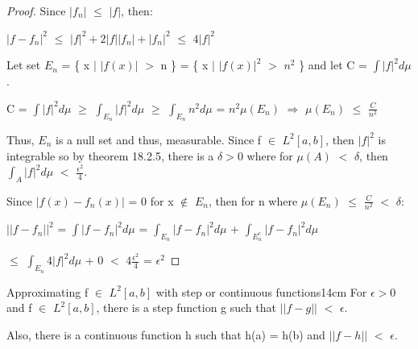     \begin{proof}
        Since $|f_n|$ $\leq$ $|f|$, then:

        \hspace{0.5cm}
        $|f - f_n|^2$
        $\leq$ $|f|^2 + 2|f||f_n| + |f_n|^2$
        $\leq$ $4|f|^2$

        Let set $E_n$ = \{ x $|$ $|f(x)|$ $>$ n \}
        = \{ x $|$ $|f(x)|^2$ $>$ $n^2$ \} and let C = $\int |f|^2 d\mu$.

        \hspace{0.5cm}
        C = $\int |f|^2 d\mu$
        $\geq$ $\int_{E_n} |f|^2 d\mu$
        $\geq$ $\int_{E_n} n^2 d\mu$
        = $n^2 \mu(E_n)$
        \hspace{0.5cm}
        $\Rightarrow$
        \hspace{0.5cm}
        $\mu(E_n)$ $\leq$ $\frac{C}{n^2}$

        Thus, $E_n$ is a null set and thus, measurable.
        Since f $\in$ $L^2[a,b]$, then $|f|^2$ is integrable
        so by {\color{red} theorem 18.2.5}, there is a $\delta > 0$
        where for $\mu(A)$ $<$ $\delta$, then
        $\int_A |f|^2 d\mu$ $<$ $\frac{\epsilon^2}{4}$.
        
        Since $|f(x) - f_n(x)|$ = 0 for x $\not \in$ $E_n$,
        then for n where $\mu(E_n)$ $\leq$ $\frac{C}{n^2}$ $<$ $\delta$:

        \hspace{0.5cm}
        $||f - f_n||^2$
        = $\int |f - f_n|^2 d\mu$
        = $\int_{E_n} |f - f_n|^2 d\mu$
            + $\int_{E_n^c} |f - f_n|^2 d\mu$

        \hspace{2.4cm}
        $\leq$ $\int_{E_n} 4|f|^2 d\mu$ + 0
        $<$ $4\frac{\epsilon^2}{4}$
        = $\epsilon^2$
    \end{proof}

    \vspace{0.5cm}



    \begin{wtheorem}{Approximating f $\in$ $L^2[a,b]$ with step or continuous
    functions}{14cm}
        For $\epsilon > 0$ and f $\in$ $L^2[a,b]$, there is a step function
        g such that $||f-g||$ $<$ $\epsilon$.

        Also, there is a continuous function h such that h(a) = h(b) and
        $||f-h||$ $<$ $\epsilon$.
    \end{wtheorem}

